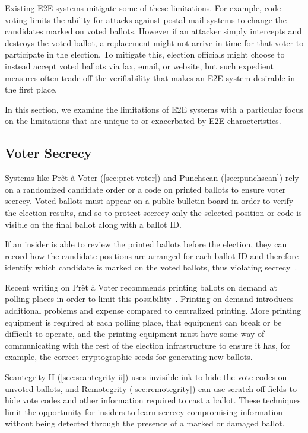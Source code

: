 Existing E2E systems mitigate some of these limitations. For example,
code voting limits the ability for attacks against postal mail systems
to change the candidates marked on voted ballots. However if an
attacker simply intercepts and destroys the voted ballot, a
replacement might not arrive in time for that voter to participate in
the election. To mitigate this, election officials might choose to
instead accept voted ballots via fax, email, or website, but such
expedient measures often trade off the verifiability that makes an E2E
system desirable in the first place.

In this section, we examine the limitations of E2E systems with a
particular focus on the limitations that are unique to or exacerbated
by E2E characteristics.

\subsection{Voter Secrecy}

Systems like Prêt à Voter (\autoref{sec:pret-voter}) and Punchscan
(\autoref{sec:punchscan}) rely on a randomized candidate order or a code
on printed ballots to ensure voter secrecy. Voted ballots must appear
on a public bulletin board in order to verify the election results,
and so to protect secrecy only the selected position or code is
visible on the final ballot along with a ballot ID.

If an insider is able to review the printed ballots before the
election, they can record how the candidate positions are arranged for
each ballot ID and therefore identify which candidate is marked on the
voted ballots, thus violating secrecy~\cite{burton2012}.

Recent writing on Prêt à Voter recommends printing ballots on demand
at polling places in order to limit this
possibility~\cite{ryan2009}. Printing on demand introduces additional
problems and expense compared to centralized printing. More printing
equipment is required at each polling place, that equipment can break
or be difficult to operate, and the printing equipment must have some
way of communicating with the rest of the election infrastructure to
ensure it has, for example, the correct cryptographic seeds for
generating new ballots.

Scantegrity II (\autoref{sec:scantegrity-ii}) uses invisible ink to hide
the vote codes on unvoted ballots, and Remotegrity
(\autoref{sec:remotegrity}) can use scratch-off fields to hide vote codes
and other information required to cast a ballot. These techniques
limit the opportunity for insiders to learn secrecy-compromising
information without being detected through the presence of a marked or
damaged ballot.

